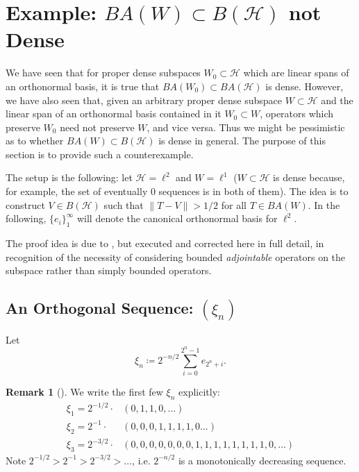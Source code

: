 \documentclass{dcthesis}
\numberwithin{equation}{section}
\numberwithin{equation}{section}
\theoremstyle{definition}
\newtheorem{remark}[equation]{Remark}
\begin{document}


\section{Example: $BA(W)\subset B(\mathcal{H})$ not Dense} %

We have seen that for proper dense subspaces $W_0\subset\mathcal{H}$ which are linear spans of an orthonormal basis, it is true that $BA(W_0)\subset BA(\mathcal{H})$ is dense. However, we have also seen that, given an arbitrary proper dense subspace $W\subset\mathcal{H}$ and the linear span of an orthonormal basis contained in it $W_0\subset W$, operators which preserve $W_0$ need not preserve $W$, and vice versa. Thus we might be pessimistic as to whether $BA(W)\subset B(\mathcal{H})$ is dense in general. The purpose of this section is to provide such a counterexample.

The setup is the following: let $\mathcal{H}=\ell^2$ and $W=\ell^1$ ($W\subset\mathcal{H}$ is dense because, for example, the set of eventually 0 sequences is in both of them). The idea is to construct $V\in B(\mathcal{H})$ such that $\|T-V\|>1/2$ for all $T\in BA(W)$. In the following, $\{e_i\}_1^\infty$ will denote the canonical orthonormal basis for $\ell^2$.

The proof idea is due to \cite{choi_heller_2017}, but executed and corrected here in full detail, in recognition of the necessity of considering bounded \textit{adjointable} operators on the subspace rather than simply bounded operators.

\subsection{An Orthogonal Sequence: $(\xi_n)$} %

Let 
\begin{equation*}
	\xi_n\coloneqq 2^{-n/2}\sum_{i=0}^{2^n-1}e_{2^n+i}.
\end{equation*}

\begin{remark}[]
	We write the first few $\xi_n$ explicitly:
	\begin{align*}
		\xi_1 = 2^{-1/2}\cdot &(0,1,1,0,\dots) \\
		\xi_2 = 2^{-1}\cdot &(0,0,0,1,1,1,1,0\dots) \\
		\xi_3 = 2^{-3/2}\cdot &(0,0,0,0,0,0,0,1,1,1,1,1,1,1,1,0,\dots)
	\end{align*}
	Note $2^{-1/2} > 2^{-1} > 2^{-3/2} > \dots$, i.e. $2^{-n/2}$ is a monotonically decreasing sequence.  
\end{remark}
\end{document}
